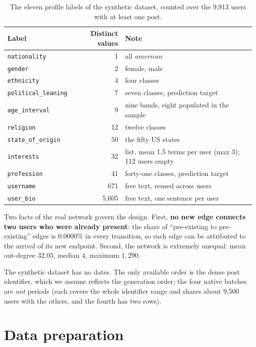 \documentclass[11pt,a4paper]{article}
\newcommand{\code}[1]{\texttt{\small #1}}
\begin{document}
\begin{table}[h]
  \centering
  \small
  \caption{The eleven profile labels of the synthetic dataset, counted over the 9,913 users with at
  least one post.}
  \label{tab:labels}
  \begin{tabular}{@{}lrl@{}}
    \toprule
    Label & Distinct values & Note \\
    \midrule
    \code{nationality}          & 1     & all \emph{american} \\
    \code{gender}               & 2     & female, male \\
    \code{ethnicity}            & 4     & four classes \\
    \code{political\_leaning}   & 7     & seven classes, prediction target \\
    \code{age\_interval}        & 9     & nine bands, eight populated in the sample \\
    \code{religion}             & 12    & twelve classes \\
    \code{state\_of\_origin}    & 50    & the fifty US states \\
    \code{interests}            & 32    & list, mean 1.5 terms per user (max 3); 112 users empty \\
    \code{profession}           & 41    & forty-one classes, prediction target \\
    \code{username}             & 671   & free text, reused across users \\
    \code{user\_bio}            & 5,605 & free text, one sentence per user \\
    \bottomrule
  \end{tabular}
\end{table}

Two facts of the real network govern the design. First, \textbf{no new edge connects two users who were
already present}: the share of ``pre-existing to pre-existing'' edges is $0.0000\%$ in every transition,
so each edge can be attributed to the arrival of its new endpoint. Second, the network is extremely
unequal: mean out-degree $32.05$, median $4$, maximum $1{,}290$.

The synthetic dataset has no dates. The only available order is the dense post identifier, which we
assume reflects the generation order; the four native batches are \emph{not} periods (each covers the
whole identifier range and shares about 9,500 users with the others, and the fourth has two rows).

\section{Data preparation}
\end{document}
